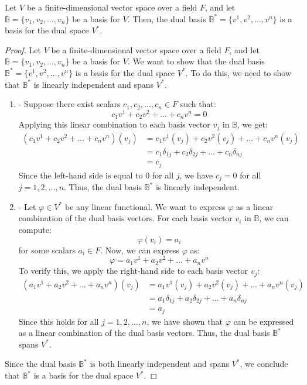 \documentclass[openany]{book}
\begin{document}
\begin{mytheorem}
Let $V$ be a finite-dimensional vector space over a field $F$, and let $\mathbb{B} = \{v_1, v_2, \ldots, v_n\}$ be a basis for $V$. Then, the dual basis $\mathbb{B}^* = \{v^1, v^2, \ldots, v^n\}$ is a basis for the dual space $V^*$.
\end{mytheorem}
\begin{proof}
Let $V$ be a finite-dimensional vector space over a field $F$, and let $\mathbb{B} = \{v_1, v_2, \ldots, v_n\}$ be a basis for $V$. We want to show that the dual basis $\mathbb{B}^* = \{v^1, v^2, \ldots, v^n\}$ is a basis for the dual space $V^*$. To do this, we need to show that $\mathbb{B}^*$ is linearly independent and spans $V^*$.
\begin{enumerate}
    \item {} - Suppose there exist scalars $c_1, c_2, \ldots, c_n \in F$ such that:
    $$c_1 v^1 + c_2 v^2 + \ldots + c_n v^n = 0$$
    Applying this linear combination to each basis vector $v_j$ in $\mathbb{B}$, we get:
    \[\begin{aligned}
    (c_1 v^1 + c_2 v^2 + \ldots + c_n v^n)(v_j) &= c_1 v^1(v_j) + c_2 v^2(v_j) + \ldots + c_n v^n(v_j) \\
    &= c_1 \delta_{1j} + c_2 \delta_{2j} + \ldots + c_n \delta_{nj} \\
    &= c_j
    \end{aligned}\]
    Since the left-hand side is equal to 0 for all $j$, we have $c_j = 0$ for all $j = 1, 2, \ldots, n$. Thus, the dual basis $\mathbb{B}^*$ is linearly independent.
    \item {} - Let $\varphi \in V^*$ be any linear functional. We want to express $\varphi$ as a linear combination of the dual basis vectors. For each basis vector $v_i$ in $\mathbb{B}$, we can compute:
    $$\varphi(v_i) = a_i$$
    for some scalars $a_i \in F$. Now, we can express $\varphi$ as:
    $$\varphi = a_1 v^1 + a_2 v^2 + \ldots + a_n v^n$$
    To verify this, we apply the right-hand side to each basis vector $v_j$:
    \[\begin{aligned}
    (a_1 v^1 + a_2 v^2 + \ldots + a_n v^n)(v_j) &= a_1 v^1(v_j) + a_2 v^2(v_j) + \ldots + a_n v^n(v_j) \\
    &= a_1 \delta_{1j} + a_2 \delta_{2j} + \ldots + a_n \delta_{nj} \\
    &= a_j
    \end{aligned}\]
    Since this holds for all $j = 1, 2, \ldots, n$, we have shown that $\varphi$ can be expressed as a linear combination of the dual basis vectors. Thus, the dual basis $\mathbb{B}^*$ spans $V^*$.
\end{enumerate}
Since the dual basis $\mathbb{B}^*$ is both linearly independent and spans $V^*$, we conclude that $\mathbb{B}^*$ is a basis for the dual space $V^*$.
\end{proof}
\end{document}
